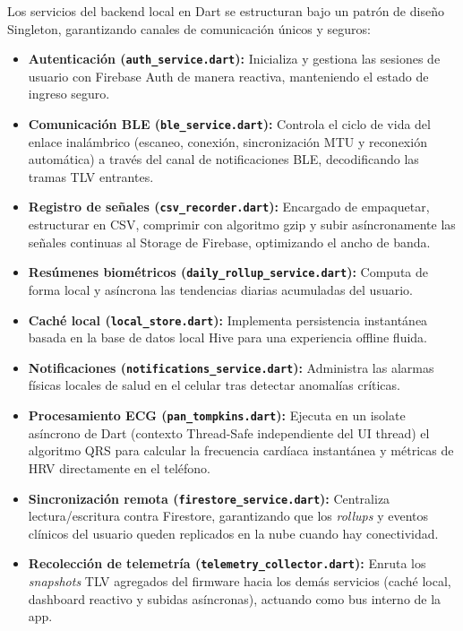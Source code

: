 \documentclass[letterpaper,11pt]{article}
\begin{document}
Los servicios del backend local en Dart se estructuran bajo un patrón de diseño Singleton, garantizando canales de comunicación únicos y seguros:
\begin{itemize}
    \item \textbf{Autenticación (\texttt{auth\_service.dart}):} Inicializa y gestiona las sesiones de usuario con Firebase Auth de manera reactiva, manteniendo el estado de ingreso seguro.
    \item \textbf{Comunicación BLE (\texttt{ble\_service.dart}):} Controla el ciclo de vida del enlace inalámbrico (escaneo, conexión, sincronización MTU y reconexión automática) a través del canal de notificaciones BLE, decodificando las tramas TLV entrantes.
    \item \textbf{Registro de señales (\texttt{csv\_recorder.dart}):} Encargado de empaquetar, estructurar en CSV, comprimir con algoritmo gzip y subir asíncronamente las señales continuas al Storage de Firebase, optimizando el ancho de banda.
    \item \textbf{Resúmenes biométricos (\texttt{daily\_rollup\_service.dart}):} Computa de forma local y asíncrona las tendencias diarias acumuladas del usuario.
    \item \textbf{Caché local (\texttt{local\_store.dart}):} Implementa persistencia instantánea basada en la base de datos local Hive para una experiencia offline fluida.
    \item \textbf{Notificaciones (\texttt{notifications\_service.dart}):} Administra las alarmas físicas locales de salud en el celular tras detectar anomalías críticas.
    \item \textbf{Procesamiento ECG (\texttt{pan\_tompkins.dart}):} Ejecuta en un isolate asíncrono de Dart (contexto Thread-Safe independiente del UI thread) el algoritmo QRS para calcular la frecuencia cardíaca instantánea y métricas de HRV directamente en el teléfono.
    \item \textbf{Sincronización remota (\texttt{firestore\_service.dart}):} Centraliza lectura/escritura contra Firestore, garantizando que los \textit{rollups} y eventos clínicos del usuario queden replicados en la nube cuando hay conectividad.
    \item \textbf{Recolección de telemetría (\texttt{telemetry\_collector.dart}):} Enruta los \textit{snapshots} TLV agregados del firmware hacia los demás servicios (caché local, dashboard reactivo y subidas asíncronas), actuando como bus interno de la app.
\end{itemize}
\end{document}
